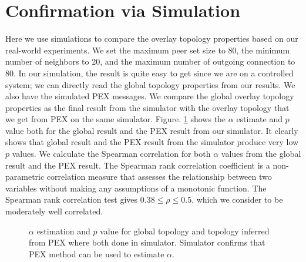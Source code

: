 \documentclass[10pt,conference,letterpaper]{IEEEtran}
\begin{document}
\section{Confirmation via Simulation}\label{simulation}

Here we use simulations to compare the overlay topology properties based  on our real-world experiments. 
We set the maximum peer set size to 80, the minimum number of neighbors to 20, and the maximum number of outgoing connection to 80. In our simulation, the result is quite easy to get since we are on a controlled system;  we can directly read the  global topology properties from our results. 
We also have the simulated PEX messages. We compare the global overlay topology properties as the final result from the simulator with the overlay topology that we get from PEX on the same simulator.
Figure. \ref{fig:simulation} shows the $\alpha$ estimate and $p$ value both for the global result and the PEX result from our simulator. 
It clearly shows that global result and the PEX result from the simulator produce very low $p$ values. 
We calculate the Spearman correlation for both $\alpha$ values from the global result and the PEX result. 
The Spearman rank correlation coefficient is a non-parametric correlation measure that assesses the relationship between two variables
without making any assumptions of a monotonic function.
The Spearman rank correlation test gives $0.38 \leq \rho \leq 0.5$, which we consider to be moderately well correlated. 

\begin{figure}
\centering
{}
\caption{$\alpha$ estimation and $p$ value for global topology and topology inferred from PEX where both done in simulator.
Simulator confirms that PEX method can be used to estimate $\alpha$.} 
\label{fig:simulation}
\end{figure}
\end{document}
